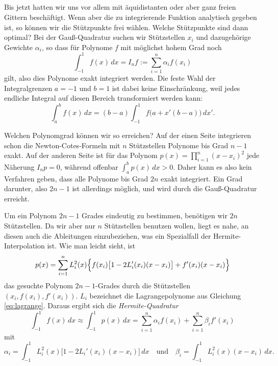 
\clearpage

\subsection{}

Bis jetzt hatten wir uns vor allem mit äquidistanten oder aber ganz
freien Gittern beschäftigt. Wenn aber die zu integrierende Funktion
analytisch gegeben ist, so können wir die Stützpunkte frei
wählen. Welche Stützpunkte sind dann optimal? Bei der Gauß-Quadratur
suchen wir Stützstellen $x_i$ und dazugehörige Gewichte $\alpha_i$, so
dass für Polynome $f$ mit möglichst hohem Grad noch
\begin{equation}
  \int_{-1}^1 f(x)\, dx = I_n f := \sum_{i=1}^n \alpha_i f(x_i)
\end{equation}
gilt, also dies Polynome exakt integriert werden. Die feste Wahl der
Integralgrenzen $a=-1$ und $b=1$ ist dabei keine Einschränkung, weil
jedes endliche Integral auf diesen Bereich transformiert werden kann:
\begin{equation}
  \int_a^b f(x)\, dx = (b-a) \int_{-1}^{1}f\bigl(a + x'(b-a)\bigr)\, dx'.
\end{equation}

Welchen Polynomgrad können wir so erreichen?  Auf der einen Seite
integrieren schon die Newton-Cotes-Formeln mit $n$ Stützstellen
Polynome bis Grad $n-1$ exakt. Auf der anderen Seite ist für das
Polynom $p(x) = \prod_{i=1}^n (x-x_i)^2$ jede Näherung $I_n p = 0$,
während offenbar $\int_{a}^{b} p(x)\,dx>0$. Daher kann es also kein
Verfahren geben, dass alle Polynome bis Grad $2n$ exakt
integriert. Ein Grad darunter, also $2n-1$ ist allerdings möglich, und
wird durch die Gauß-Quadratur erreicht.

Um ein Polynom $2n-1$ Grades eindeutig zu bestimmen, benötigen wir
$2n$ Stützstellen. Da wir aber nur $n$ Stützstellen benutzen wollen,
liegt es nahe, an diesen auch die Ableitungen einzubeziehen, was ein
Spezialfall der Hermite-Interpolation ist. Wie man leicht sieht, ist
\begin{equation}
  p(x) = \sum_{i=1}^n L_i^2(x)\Bigl\{f(x_i)\bigl[1-2L_i'(x_i)(x-x_i)\bigr] +
    f'(x_i)(x-x_i)\Bigr\}
\end{equation}
das gesuchte Polynom $2n-1$-Grades durch die Stützstellen $(x_i,
f(x_i), f'(x_i))$. $L_i$ bezeichnet die Lagrangepolynome aus Gleichung
\eqref{eq:lagrange}. Daraus ergibt sich die \emph{Hermite-Quadratur}
\begin{equation}
  \int_{-1}^1 f(x)\, dx \approx \int_{-1}^1 p(x)\, dx =
  \sum_{i=1}^{n} \alpha_i f(x_i) + \sum_{i=1}^{n} \beta_i f'(x_i)
\end{equation}
mit
\begin{equation}
  \alpha_i = \int_{-1}^1 L_i^2(x)\bigl[1-2L_i'(x_i)(x-x_i)\bigr]\,dx
  \quad\text{und}\quad
  \beta_i = \int_{-1}^1 L_i^2(x)(x-x_i)\, dx.
\end{equation}

